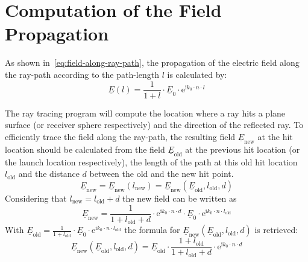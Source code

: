 \section{Computation of the Field Propagation}\label{section:calculation_of_the_field_propagation}
As shown in~\eqref{eq:field-along-ray-path}, the propagation of the electric field along the ray-path according to the path-length \(l\) is calculated by:
\begin{equation}
    \underline{E}(l) = \frac{1}{1 + l} \cdot \underline{E}_0 \cdot \mathrm{e}^{\mathrm{i} k_0 \cdot n \cdot l}
\end{equation} 

The ray tracing program will compute the location where a ray hits a plane surface (or receiver sphere respectively) and the direction of the reflected ray.
To efficiently trace the field along the ray-path, the resulting field \(\underline{E}_{\text{new}}\) at the hit location should be calculated from the field \(\underline{E}_{\text{old}}\) at the previous hit location (or the launch location respectively), the length of the path at this old hit location \(l_{\text{old}}\) and the distance \(d\) between the old and the new hit point.
\begin{equation}
    \underline{E}_{\text{new}} = \underline{E}_{\text{new}}(l_{\text{new}}) = \underline{E}_{\text{new}}(\underline{E}_{\text{old}}, l_{\text{old}}, d)
\end{equation}
Considering that \(l_{\text{new}} = l_{\text{old}} + d\) the new field can be written as
\begin{equation}
    \underline{E}_{\text{new}} = \frac{1}{1 + l_{\text{old}} + d} \cdot \mathrm{e}^{\mathrm{i} k_0 \cdot n \cdot d}  \cdot \underline{E}_{0} \cdot \mathrm{e}^{\mathrm{i} k_0 \cdot n \cdot l_{\text{old}}} 
\end{equation}
With \(\underline{E}_{\text{old}} = \frac{1}{1 + l_{\text{old}}} \cdot \underline{E}_0 \cdot \mathrm{e}^{\mathrm{i} k_0 \cdot n \cdot l_{\text{old}}} \) the formula for \(\underline{E}_{\text{new}}(\underline{E}_{\text{old}}, l_{\text{old}}, d)\) is retrieved:
\begin{equation}
    \underline{E}_{\text{new}}(\underline{E}_{\text{old}}, l_{\text{old}}, d) = \underline{E}_{\text{old}} \cdot \frac{1 + l_{\text{old}}}{1 + l_{\text{old}} + d} \cdot \mathrm{e}^{\mathrm{i} k_0 \cdot n \cdot d}
\end{equation}
